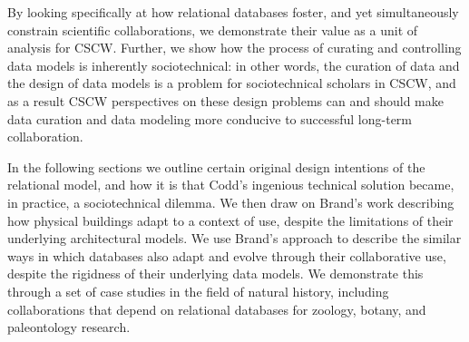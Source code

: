 By looking specifically at how relational databases foster, and yet simultaneously constrain scientific collaborations, we demonstrate their value as a unit of analysis for CSCW. Further, we show how the process of curating and controlling data models is inherently sociotechnical: in other words, the curation of data and the design of data models is a problem for sociotechnical scholars in CSCW, and as a result CSCW perspectives on these design problems can and should make data curation and data modeling more conducive to successful long-term collaboration. 

In the following sections we outline certain original design intentions of the relational model, and how it is that Codd's ingenious technical solution became, in practice, a sociotechnical dilemma. We then draw on Brand's work describing how physical buildings adapt to a context of use, despite the limitations of their underlying architectural models. We use Brand's approach to describe the similar ways in which databases also adapt and evolve through their collaborative use, despite the rigidness of their underlying data models. We demonstrate this through a set of case studies in the field of natural history, including collaborations that depend on relational databases for zoology, botany, and paleontology research.  


